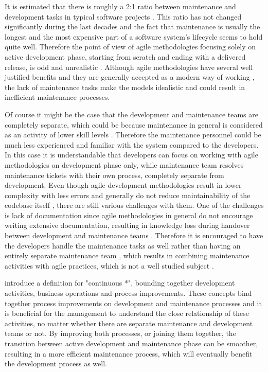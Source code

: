 It is estimated that there is roughly a 2:1 ratio between maintenance and development tasks in typical software projects \citep{Sommerville2011}. This ratio has not changed significantly
during the last decades and the fact that maintenance is usually the longest and the most expensive part of a software system's lifecycle seems to hold quite well. Therefore the point of view of
agile methodologies focusing solely on active development phase, starting from scratch and ending with a delivered release, is odd and unrealistic \citep{Hanssen2009}\citep{Kajko-Mattsson2009}.
Although agile methodologies have several well justified benefits and they are generally accepted as a modern way of working \citep{Sommerville2011},
the lack of maintenance tasks make the models idealistic and could result in inefficient maintenance processes.

Of course it might be the case that the development and maintenance teams are completely separate, which could be because maintenance in general is considered as an activity of lower skill levels \citep{Sommerville2011}.
Therefore the maintenance personnel could be much less experienced and familiar with the system compared to the developers. In this case it is understandable that developers can focus on working with agile
methodologies on development phase only, while maintenance team resolves maintenance tickets with their own process, completely separate from development.
Even though agile development methodologies result in lower complexity with less errors and generally do not reduce maintainability of the codebase itself \citep{Knippers2011},
there are still various challenges with them. One of the challenges is
lack of documentation since agile methodologies in general do not encourage writing extensive documentation, resulting in knowledge loss during handover between development and maintenance teams
\citep{Ito2016}\citep{Sommerville2011}\citep{Stettina2013}. Therefore it is encouraged to have the developers handle the maintenance tasks as well rather than having an entirely separate maintenance
team \citep{Sommerville2011}\citep{Stettina2013}, which results in combining maintenance activities with agile practices, which is not a well studied subject \citep{Kajko-Mattsson2009}.

\citet{Fitzgerald2014} introduce a definition for "continuous *", bounding together development activities, business operations and process improvements. These concepts
bind together process improvements on development and maintenance processes
and it is beneficial for the management to understand the close relationship of these activities, no matter whether there are separate maintenance and development teams or not. By improving
both processes, or joining them together, the transition between active development and maintenance phase can be smoother,
resulting in a more efficient maintenance process, which will eventually benefit the development process as well. 

